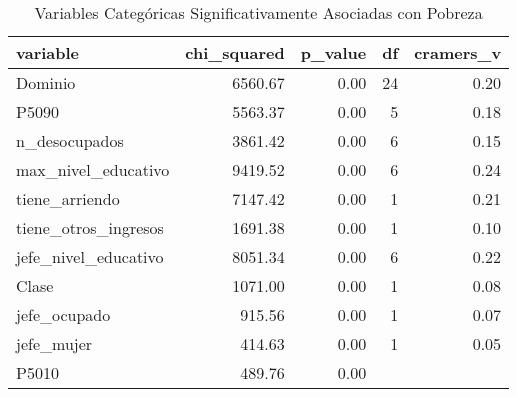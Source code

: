 \begin{table}[ht]
\centering
\begin{tabular}{lrrrr}
  \toprule
variable & chi\_squared & p\_value & df & cramers\_v \\ 
  \midrule
Dominio & 6560.67 & 0.00 &  24 & 0.20 \\ 
  P5090 & 5563.37 & 0.00 &   5 & 0.18 \\ 
  n\_desocupados & 3861.42 & 0.00 &   6 & 0.15 \\ 
  max\_nivel\_educativo & 9419.52 & 0.00 &   6 & 0.24 \\ 
  tiene\_arriendo & 7147.42 & 0.00 &   1 & 0.21 \\ 
  tiene\_otros\_ingresos & 1691.38 & 0.00 &   1 & 0.10 \\ 
  jefe\_nivel\_educativo & 8051.34 & 0.00 &   6 & 0.22 \\ 
  Clase & 1071.00 & 0.00 &   1 & 0.08 \\ 
  jefe\_ocupado & 915.56 & 0.00 &   1 & 0.07 \\ 
  jefe\_mujer & 414.63 & 0.00 &   1 & 0.05 \\ 
  P5010 & 489.76 & 0.00 &  &  \\ 
   \bottomrule
\end{tabular}
\caption{Variables Categóricas Significativamente Asociadas con Pobreza} 
\label{tab:signif_cat_vars}
\end{table}
